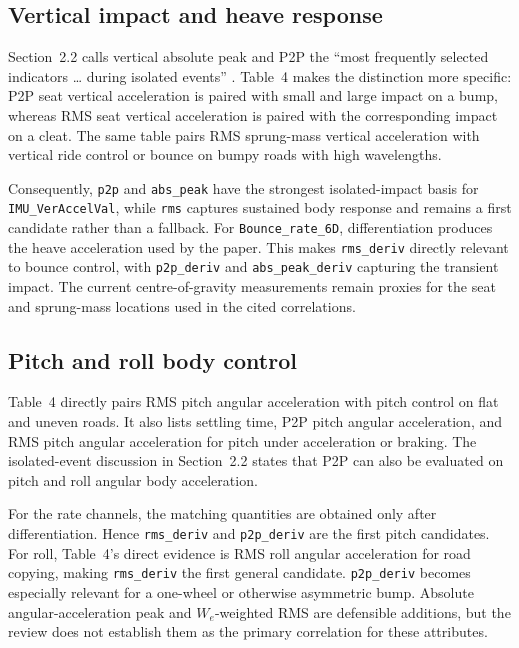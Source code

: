 \documentclass[letterpaper,journal]{IEEEtran}
\begin{document}
\subsection{Vertical impact and heave response}

Section~2.2 calls vertical absolute peak and P2P the ``most frequently selected indicators
\ldots{} during isolated events'' \cite{guastadisegni2024}. Table~4 makes the distinction more
specific: P2P seat vertical acceleration is paired with small and large impact on a bump,
whereas RMS seat vertical acceleration is paired with the corresponding impact on a cleat.
The same table pairs RMS sprung-mass vertical acceleration with vertical ride control or bounce
on bumpy roads with high wavelengths.

Consequently, \texttt{p2p} and \texttt{abs\_peak} have the strongest isolated-impact basis for
\texttt{IMU\_VerAccelVal}, while \texttt{rms} captures sustained body response and remains a
first candidate rather than a fallback. For \texttt{Bounce\_rate\_6D}, differentiation produces
the heave acceleration used by the paper. This makes \texttt{rms\_deriv} directly relevant to
bounce control, with \texttt{p2p\_deriv} and \texttt{abs\_peak\_deriv} capturing the transient
impact. The current centre-of-gravity measurements remain proxies for the seat and sprung-mass
locations used in the cited correlations.

\subsection{Pitch and roll body control}

Table~4 directly pairs RMS pitch angular acceleration with pitch control on flat and uneven
roads. It also lists settling time, P2P pitch angular acceleration, and RMS pitch angular
acceleration for pitch under acceleration or braking. The isolated-event discussion in
Section~2.2 states that P2P can also be evaluated on pitch and roll angular body acceleration.

For the rate channels, the matching quantities are obtained only after differentiation. Hence
\texttt{rms\_deriv} and \texttt{p2p\_deriv} are the first pitch candidates. For roll, Table~4's
direct evidence is RMS roll angular acceleration for road copying, making
\texttt{rms\_deriv} the first general candidate. \texttt{p2p\_deriv} becomes especially relevant
for a one-wheel or otherwise asymmetric bump. Absolute angular-acceleration peak and
$W_e$-weighted RMS are defensible additions, but the review does not establish them as the
primary correlation for these attributes.
\end{document}
